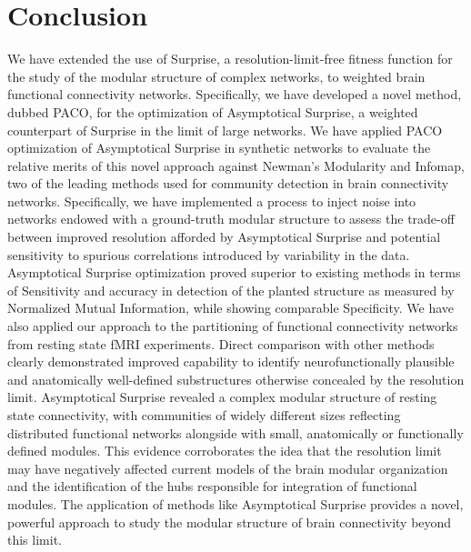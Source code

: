 \section{Conclusion}
We have extended the use of Surprise, a resolution-limit-free fitness function for the study of the modular structure of complex networks, to weighted brain functional connectivity networks. Specifically, we have developed a novel method, dubbed PACO, for the optimization of Asymptotical Surprise, a weighted counterpart of Surprise in the limit of large networks. We have applied PACO optimization of Asymptotical Surprise in synthetic networks to evaluate the relative merits of this novel approach against Newman's Modularity and Infomap, two of the leading methods used for community detection in brain connectivity networks. Specifically, we have implemented a process to inject noise into networks endowed with a ground-truth modular structure to assess the trade-off between improved resolution afforded by Asymptotical Surprise and potential sensitivity to spurious correlations introduced by variability in the data. Asymptotical Surprise optimization proved superior to existing methods in terms of Sensitivity and accuracy in detection of the planted structure as measured by Normalized Mutual Information, while showing comparable Specificity. We have also applied our approach to the partitioning of functional connectivity networks from resting state fMRI experiments. Direct comparison with other methods clearly demonstrated improved capability to identify neurofunctionally plausible and anatomically well-defined substructures otherwise concealed by the resolution limit. Asymptotical Surprise revealed a complex modular structure of resting state connectivity, with communities of widely different sizes reflecting distributed functional networks alongside with small, anatomically or functionally defined modules. This evidence corroborates the idea that the resolution limit may have negatively affected current models of the brain modular organization and the identification of the hubs responsible for integration of functional modules.  The application of methods like Asymptotical Surprise provides a novel, powerful approach to study the modular structure of brain connectivity beyond this limit.



